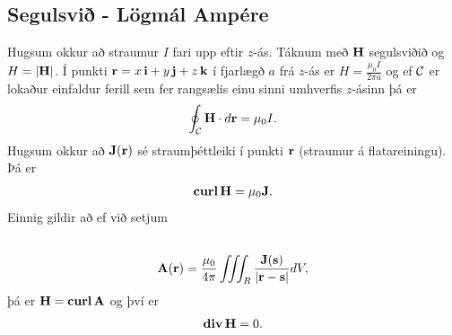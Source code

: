 \documentclass[a4paper,10pt,icelandic]{sphinxmanual}
\begin{document}
\subsection{Segulsvið - Lögmál Ampére}
\label{Kafli6:segulsvi-logmal-ampere}
Hugsum okkur að straumur \(I\) fari upp eftir \(z\)-ás. Táknum
með \(\mbox{${\bf H}$}\) segulsviðið og
\(H=|\mbox{${\bf H}$}|\). Í punkti
\(\mbox{${\bf r}$}=x\,\mbox{${\bf i}$}+y\,\mbox{${\bf j}$}+z\,\mbox{${\bf k}$}\)
í fjarlægð \(a\) frá \(z\)-ás er
\(H=\frac{\mu_0 I}{2\pi a}\) og ef \(\cal C\) er lokaður
einfaldur ferill sem fer rangsælis einu sinni umhverfis \(z\)-ásinn
þá er
\begin{gather}
\begin{split}\displaystyle \oint_{\cal C} \mbox{${\bf H}$}\cdot d\mbox{${\bf r}$}=\mu_0 I.\end{split}\notag
\end{gather}
Hugsum okkur að \(\mathbf{J}(\mbox{${\bf r}$})\) sé straumþéttleiki
í punkti \(\mbox{${\bf r}$}\) (straumur á flatareiningu). Þá er
\begin{gather}
\begin{split}\displaystyle \mbox{${\rm\bf curl\,}$}\mbox{${\bf H}$}= \mu_0 \mathbf{J}.\end{split}\notag
\end{gather}
Einnig gildir að ef við setjum
\begin{gather}
\begin{split}\displaystyle\end{split}\notag\\\begin{split}\mbox{${\bf A}$}(\mbox{${\bf r}$})=\frac{\mu_0}{4\pi}\iiint_{R}
\frac{\mathbf{J}(\mathbf{s})}{|\mbox{${\bf r}$}-\mbox{${\bf s}$}|}dV,\end{split}\notag
\end{gather}
þá er \(\mbox{${\bf H}$}=\mbox{${\rm\bf curl\,}$}\mbox{${\bf A}$}\)
og því er
\begin{gather}
\begin{split}\displaystyle \mbox{${\rm\bf div\,}$}\mbox{${\bf H}$}=0.\end{split}\notag
\end{gather}
\end{document}
